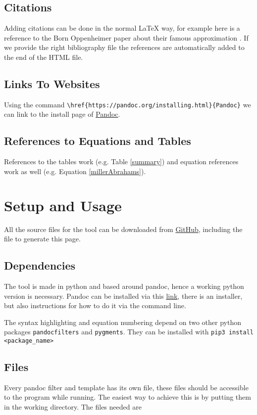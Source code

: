 \documentclass[11pt, a4paper]{article}
\begin{document}
	\subsection{Citations}
	Adding citations can be done in the normal LaTeX way, for example here is a reference to the Born Oppenheimer paper about their famous approximation \cite{Born1927}. If we provide the right bibliography file the references are automatically added to the end of the HTML file.
	
	\subsection{Links To Websites}
	Using the command \lstinline|\href{https://pandoc.org/installing.html}{Pandoc}| we can link to the install page of \href{https://pandoc.org/installing.html}{Pandoc}.
	
	\subsection{References to Equations and Tables}
	References to the tables work (e.g. Table \ref{summary}) and equation references work as well (e.g. Equation \ref{millerAbrahams}).
	
	\section{Setup and Usage}
	All the source files for the tool can be downloaded from \href{https://pandoc.org/installing.html}{GitHub}, including the file to generate this page.
	
	\subsection{Dependencies}
	The tool is made in python and based around pandoc, hence a working python version is necessary. Pandoc can be installed via this \href{https://pandoc.org/installing.html}{link}, there is an installer, but also instructions for how to do it via the command line.
	
	The syntax highlighting and equation numbering depend on two other python packages \lstinline{pandocfilters} and \lstinline{pygments}. They can be installed with \lstinline|pip3 install <package_name>|
	
	\subsection{Files}
	Every pandoc filter and template has its own file, these files should be accessible to the program while running. The easiest way to achieve this is by putting them in the working directory. The files needed are
	
\end{document}
